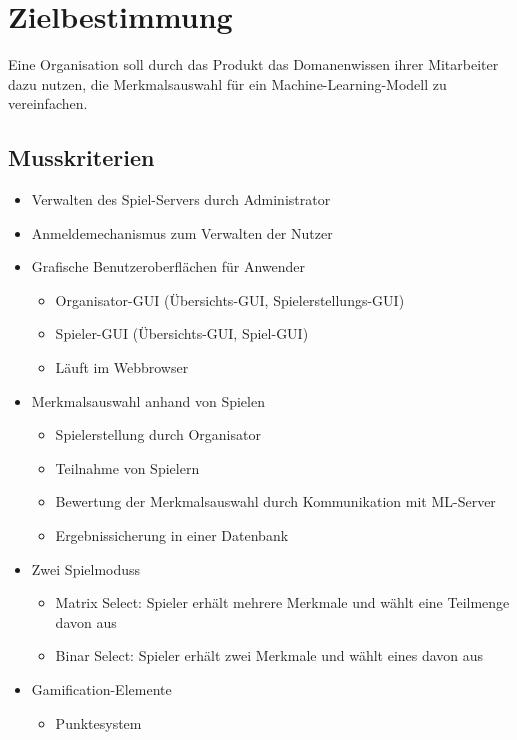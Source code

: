 \documentclass[a4paper]{scrreprt}
\begin{document}
    \chapter{Zielbestimmung}
    Eine Organisation soll durch das \Gls{Produkt} das \Gls{Domanenwissen} ihrer Mitarbeiter dazu nutzen, die Merkmalsauswahl für ein Machine-Learning-Modell zu vereinfachen.



    \section{Musskriterien}
    \begin{itemize} %
        \item Verwalten des \Gls{Spiel-Server}s durch \Gls{Administrator}
    	\item Anmeldemechanismus zum Verwalten der Nutzer
	\item Grafische Benutzeroberflächen für Anwender 
        \begin{itemize}
            \item Organisator-GUI (Übersichts-GUI, Spielerstellungs-GUI) 
            \item Spieler-GUI (Übersichts-GUI, Spiel-GUI) 
            \item Läuft im \Gls{Webbrowser}
        \end{itemize}
        \item Merkmalsauswahl anhand von Spielen  %
        \begin{itemize}
            \item Spielerstellung durch \Gls{Organisator}
            \item Teilnahme von \Gls{Spieler}n %
            \item Bewertung der Merkmalsauswahl durch Kommunikation mit \Gls{ML-Server}
            \item Ergebnissicherung in einer Datenbank 
        \end{itemize}
        \item Zwei \Glspl{Spielmodus}
        \begin{itemize}
            \item \Gls{Matrix Select}: \Gls{Spieler} erhält mehrere Merkmale und wählt eine Teilmenge davon aus %
            \item \Gls{Binar Select}: \Gls{Spieler} erhält zwei Merkmale und wählt eines davon aus
        \end{itemize}
        \item Gamification-Elemente
        \begin{itemize}
                  \item Punktesystem 
        \end{itemize}
    \end{itemize}
    \newpage %
\end{document}
